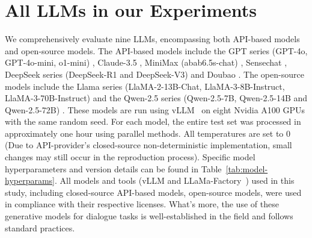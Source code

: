 
\section{All LLMs in our Experiments} \label{app:models}

We comprehensively evaluate nine LLMs, encompassing both API-based models and open-source models. The API-based models include the GPT series (GPT-4o, GPT-4o-mini, o1-mini) \citep{GPT-4, openai20254o,openai2025o1}, Claude-3.5 \citep{anthropic2025}, MiniMax (abab6.5s-chat) \citep{minimaxi2025}, Sensechat \citep{sensetime2025}, DeepSeek series (DeepSeek-R1 and DeepSeek-V3) \citep{deepseekai2025deepseekr1incentivizingreasoningcapability,deepseekai2024deepseekv3technicalreport} and Doubao \citep{doubao2025}. The open-source models include the Llama series (LlaMA-2-13B-Chat, LlaMA-3-8B-Instruct, LlaMA-3-70B-Instruct) \citep{LLaMA} and the Qwen-2.5 series (Qwen-2.5-7B, Qwen-2.5-14B and Qwen-2.5-72B) \citep{qwen2025qwen25technicalreport}. These models are run using vLLM~\citep{kwon2023efficient} on eight Nvidia A100 GPUs with the same random seed. For each model, the entire test set was processed in approximately one hour using parallel methods. All temperatures are set to 0 (Due to API-provider's closed-source non-deterministic implementation, small changes may still occur in the reproduction process). Specific model hyperparameters and version details can be found in Table~\ref{tab:model-hyperparams}. All models and tools (vLLM and LLaMa-Factory~\citep{zheng2024llamafactory}) used in this study, including closed-source API-based models, open-source models, were used in compliance with their respective licenses. What's more, the use of these generative models for dialogue tasks is well-established in the field and follows standard practices.

